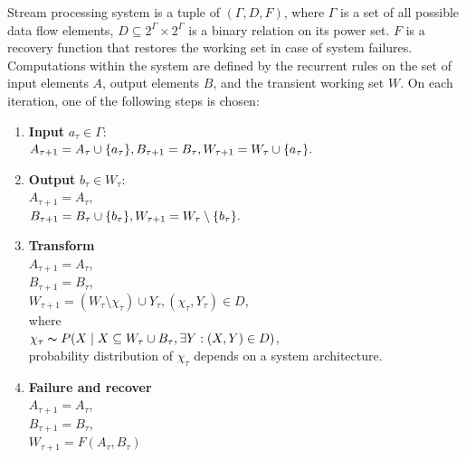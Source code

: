 \begin{definition}{Stream processing system}
\label{reference_system}
is a tuple of $(\Gamma,D,F)$, where $\Gamma$ is a set of all possible data flow elements, $D\subseteq{2^{\Gamma}\times2^{\Gamma}}$ is a binary relation on its power set. $F$ is a recovery function that restores the working set in case of system failures. Computations within the system are defined by the recurrent rules on the set of input elements $A$, output elements $B$, and the transient working set $W$. On each iteration, one of the following steps is chosen:

\begin{enumerate}
    \item \textbf{Input} $a_\tau\in{\Gamma}$:\\ $A_{\tau+1}=A_\tau \cup \{a_\tau\}, \\ B_{\tau+1}=B_{\tau}, \\ W_{\tau+1}=W_{\tau} \cup \{a_\tau\}.$
    \item \textbf{Output} $b_\tau\in{W_\tau}$:\\ $A_{\tau + 1} = A_{\tau}$, \\ $B_{\tau+1}=B_\tau \cup \{b_\tau\}, \\ W_{\tau+1}=W_{\tau} \setminus \{b_\tau\}.$
    \item \textbf{Transform}\\ $A_{\tau + 1} = A_{\tau}$,\\ $B_{\tau+1}=B_{\tau}$, \\ $W_{\tau+1}=(W_\tau \setminus \chi_\tau) \cup Y_\tau, (\chi_\tau,Y_\tau) \in D$, \\where\\$\chi_\tau \thicksim P(X\mid X \subseteq W_\tau \cup B_\tau , \exists Y : (X,Y) \in D)$, \\ probability distribution of $\chi_\tau$ depends on a system architecture. \label{random_formula}
    \item \textbf{Failure and recover} \\  $A_{\tau + 1} = A_{\tau}$,\\ $B_{\tau+1}=B_{\tau}$, \\ $W_{\tau+1} = F(A_\tau,B_\tau)$
\end{enumerate}

\end{definition}


